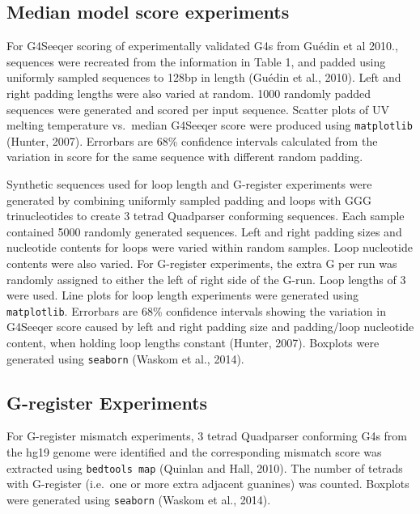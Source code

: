 \documentclass[12pt,a4paper,]{report}
\begin{document}
\hypertarget{median-model-score-experiments}{%
\subsection{Median model score
experiments}\label{median-model-score-experiments}}

For G4Seeqer scoring of experimentally validated G4s from Guédin et al
2010., sequences were recreated from the information in Table 1, and
padded using uniformly sampled sequences to 128bp in length (Guédin et
al., 2010). Left and right padding lengths were also varied at random.
1000 randomly padded sequences were generated and scored per input
sequence. Scatter plots of UV melting temperature vs.~median G4Seeqer
score were produced using \texttt{matplotlib} (Hunter, 2007). Errorbars
are 68\% confidence intervals calculated from the variation in score for
the same sequence with different random padding.

Synthetic sequences used for loop length and G-register experiments were
generated by combining uniformly sampled padding and loops with GGG
trinucleotides to create 3 tetrad Quadparser conforming sequences. Each
sample contained 5000 randomly generated sequences. Left and right
padding sizes and nucleotide contents for loops were varied within
random samples. Loop nucleotide contents were also varied. For
G-register experiments, the extra G per run was randomly assigned to
either the left of right side of the G-run. Loop lengths of 3 were used.
Line plots for loop length experiments were generated using
\texttt{matplotlib}. Errorbars are 68\% confidence intervals showing the
variation in G4Seeqer score caused by left and right padding size and
padding/loop nucleotide content, when holding loop lengths constant
(Hunter, 2007). Boxplots were generated using \texttt{seaborn} (Waskom
et al., 2014).

\hypertarget{g-register-experiments}{%
\subsection{G-register Experiments}\label{g-register-experiments}}

For G-register mismatch experiments, 3 tetrad Quadparser conforming G4s
from the hg19 genome were identified and the corresponding mismatch
score was extracted using \texttt{bedtools\ map} (Quinlan and Hall,
2010). The number of tetrads with G-register (i.e.~one or more extra
adjacent guanines) was counted. Boxplots were generated using
\texttt{seaborn} (Waskom et al., 2014).
\end{document}
